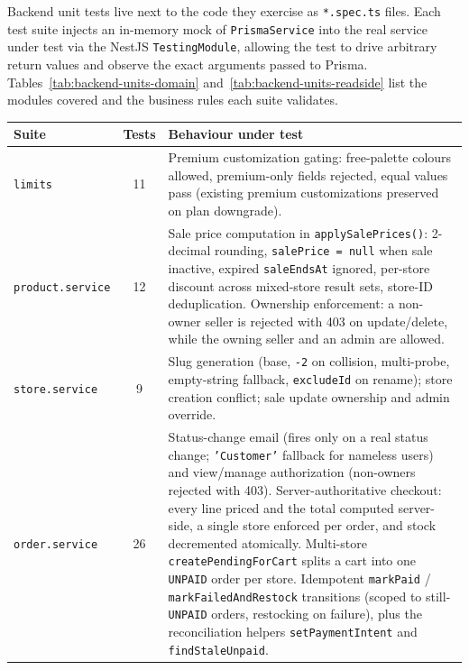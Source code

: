\documentclass[12pt, a4paper, oneside]{report}
\begin{document}
Backend unit tests live next to the code they exercise as
\texttt{*.spec.ts} files. Each test suite injects an in-memory mock
of \texttt{PrismaService} into the real service under test via the
NestJS \texttt{TestingModule}, allowing the test to drive arbitrary
return values and observe the exact arguments passed to Prisma.
Tables~\ref{tab:backend-units-domain} and~\ref{tab:backend-units-readside} list the modules covered and the
business rules each suite validates.

\begin{table}[H]
\centering
\small
\setlength{\tabcolsep}{8pt}
\setlength{\extrarowheight}{3pt}
\renewcommand{\arraystretch}{1.4}
\begin{tabular}{|>{\raggedright\arraybackslash}p{3.8cm}|c|>{\raggedright\arraybackslash}p{6.8cm}|}
\hline
\rowcolor{cheebolightgray}
\textbf{Suite} & \textbf{Tests} & \textbf{Behaviour under test} \\
\hline
\texttt{limits} & 11 & Premium customization gating: free-palette colours allowed, premium-only fields rejected, equal values pass (existing premium customizations preserved on plan downgrade). \\
\hline
\texttt{product.service} & 12 & Sale price computation in \texttt{applySalePrices()}: 2-decimal rounding, \texttt{salePrice = null} when sale inactive, expired \texttt{saleEndsAt} ignored, per-store discount across mixed-store result sets, store-ID deduplication. Ownership enforcement: a non-owner seller is rejected with 403 on update/delete, while the owning seller and an admin are allowed. \\
\hline
\texttt{store.service} & 9 & Slug generation (base, \texttt{-2} on collision, multi-probe, empty-string fallback, \texttt{excludeId} on rename); store creation conflict; sale update ownership and admin override. \\
\hline
\texttt{order.service} & 26 & Status-change email (fires only on a real status change; \texttt{'Customer'} fallback for nameless users) and view/manage authorization (non-owners rejected with 403). Server-authoritative checkout: every line priced and the total computed server-side, a single store enforced per order, and stock decremented atomically. Multi-store \texttt{createPendingForCart} splits a cart into one \texttt{UNPAID} order per store. Idempotent \texttt{markPaid} / \texttt{markFailedAndRestock} transitions (scoped to still-\texttt{UNPAID} orders, restocking on failure), plus the reconciliation helpers \texttt{setPaymentIntent} and \texttt{findStaleUnpaid}. \\

\end{tabular}
\end{table}
\end{document}
